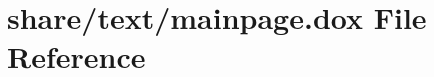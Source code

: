 \hypertarget{mainpage_8dox}{\section{share/text/mainpage.dox File Reference}
\label{mainpage_8dox}
}
